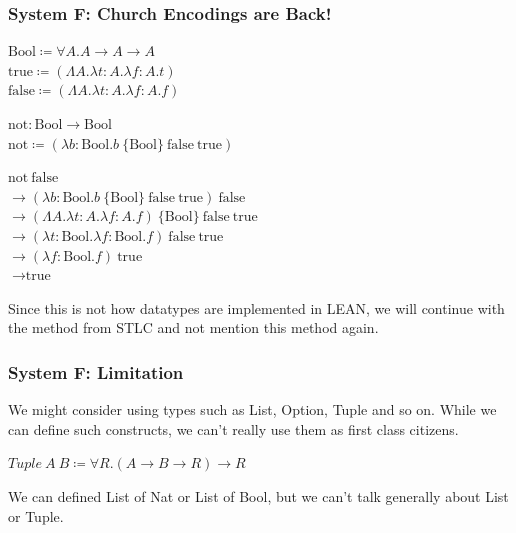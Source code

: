 \documentclass{beamer}
\newcommand{\bool}{\text{Bool}}
\newcommand{\true}{\text{true}}
\newcommand{\false}{\text{false}}
\begin{document}
\begin{frame}[fragile]
  \frametitle{System F: Church Encodings are Back!}

  $\bool \coloneqq \forall A . A \rightarrow A \rightarrow A$ \\
  $\true \coloneqq (\Lambda A . \lambda t : A . \lambda f : A . t)$ \\
  $\false \coloneqq (\Lambda A . \lambda t : A . \lambda f : A . f)$ \\

  \vspace{5mm}

  $\text{not} : \bool \rightarrow \bool$ \\
  $\text{not} \coloneqq (\lambda b : \bool . b\ \{\bool\}\ \false\ \true)$

  \vspace{5mm}

  $\text{not}\ \false$ \\
  \pause
  $\rightarrow (\lambda b : \bool . b\ \{\bool\}\ \false\ \true)\ \false$ \\
  \pause
  $\rightarrow (\Lambda A . \lambda t : A . \lambda f : A . f)\ \{\bool\}\ \false\ \true$ \\
  \pause
  $\rightarrow (\lambda t : \bool . \lambda f : \bool . f)\ \false\ \true$ \\
  \pause
  $\rightarrow (\lambda f : \bool . f)\ \true$ \\
  \pause
  $\rightarrow \true$ \\

  \vspace{5mm}

  Since this is not how datatypes are implemented in LEAN, we will continue with the method from STLC and not mention this method again.
\end{frame}




\begin{frame}[fragile]
  \frametitle{System F: Limitation}

  We might consider using types such as List, Option, Tuple and so on.
  While we can define such constructs, we can't really use them as first class citizens.

  \vspace{5mm}

  $ Tuple\ A\ B \coloneqq \forall R. (A \rightarrow B \rightarrow R) \rightarrow R $ \\

  \vspace{5mm}

  We can defined List of Nat or List of Bool, but we can't talk generally about List or Tuple.

\end{frame}
\end{document}
